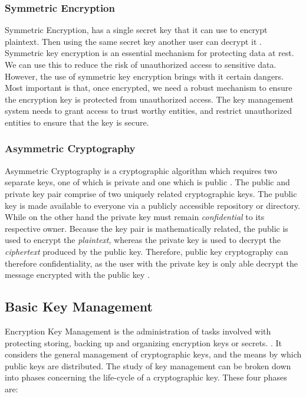 \documentclass[11pt, a4paper, notitlepage]{article}
\begin{document}
\subsubsection*{Symmetric Encryption}
Symmetric Encryption, has a single secret key that it can use to encrypt plaintext. Then using the same secret key another user can decrypt it \cite{ferguson2003practical}. Symmetric key encryption is an essential mechanism for protecting data at rest. We can use this to reduce the risk of unauthorized access to sensitive data. However, the use of symmetric key encryption brings with it certain dangers. Most important is that, once encrypted, we need a robust mechanism to ensure the encryption key is protected from unauthorized access. The key management system needs to grant access to trust worthy entities, and restrict unauthorized entities to ensure that the key is secure. 

\subsubsection*{Asymmetric Cryptography}
Asymmetric Cryptography is a cryptographic algorithm which requires two separate keys, one of which is private and one which is public \cite{ferguson2003practical}.
The public and private key pair comprise of two uniquely related cryptographic keys. The public key is made available to everyone via a publicly accessible repository or directory. While on the other hand the private key must remain \emph{confidential} to its respective owner. Because the key pair is mathematically related, the public is used to encrypt the \emph{plaintext}, whereas the private key is used to decrypt the \emph{ciphertext} produced by the public key. Therefore, public key cryptography can therefore confidentiality, as the user with the private key is only able decrypt the message encrypted with the public key \cite{pub-key}.

\subsection*{Basic Key Management}
Encryption Key Management is the administration of tasks involved with protecting storing, backing up and organizing encryption keys or secrets. \cite{defination:key-management}. It considers the general management of cryptographic keys, and the means by which public keys are distributed. The study of key management can be broken down into phases concerning the life-cycle of a cryptographic key. These four phases are: \\
\end{document}
